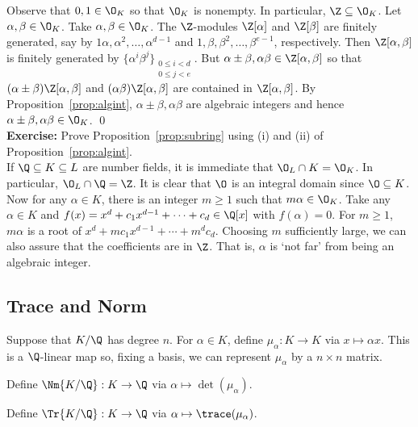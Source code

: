 \pf Observe that $0,1 \in \O_K$ so that $\O_K$ is nonempty. In particular, $\Z \subseteq \O_K$. Let $\alpha, \beta \in \O_K$. Take $\alpha, \beta \in \O_K$. The $\Z$-modules $\Z[\alpha]$ and $\Z[\beta]$ are finitely generated, say by $1\alpha,\alpha^2,\ldots,\alpha^{d-1}$ and $1,\beta,\beta^2,\ldots,\beta^{e-1}$, respectively. Then $\Z[\alpha,\beta]$ is finitely generated by $\{\alpha^i \beta^j\}_{\substack{0 \leq i < d \\ 0 \leq j < e}}$. But $\alpha \pm \beta,\alpha\beta \in \Z[\alpha,\beta]$ so that $(\alpha \pm \beta) \Z[\alpha,\beta]$ and $(\alpha\beta)\Z[\alpha,\beta]$ are contained in $\Z[\alpha,\beta]$. By Proposition~\ref{prop:algint}, $\alpha\pm \beta, \alpha\beta$ are algebraic integers and hence $\alpha\pm\beta,\alpha\beta \in \O_K$. \qed \\


\noindent \textbf{Exercise: } Prove Proposition~\ref{prop:subring} using (i) and (ii) of Proposition~\ref{prop:algint}. \\

If $\Q \subseteq K \subseteq L$ are number fields, it is immediate that $\O_L \cap K = \O_K$. In particular, $\O_L \cap \Q= \Z$. It is clear that $\O$ is an integral domain since $\O \subseteq K$. Now for any $\alpha \in K$, there is an integer $m \geq 1$ such that $m\alpha \in \O_K$. Take any $\alpha \in K$ and $f(x)=x^d+c_1x^{d-1}+\cdots+c_d \in \Q[x]$ with $f(\alpha)=0$. For $m \geq 1$, $m\alpha$ is a root of $x^d+mc_1x^{d-1}+\cdots+m^dc_d$. Choosing $m$ sufficiently large, we can also assure that the coefficients are in $\Z$. That is, $\alpha$ is `not far' from being an algebraic integer. 


\subsection{Trace and Norm}

Suppose that $K/\Q$ has degree $n$. For $\alpha \in K$, define $\mu_\alpha: K \to K$ via $x \mapsto \alpha x$. This is a $\Q$-linear map so, fixing a basis, we can represent $\mu_\alpha$ by a $n \times n$ matrix. 

\begin{dfn}[Norm]
Define $\Nm{K/\Q}: K \to \Q$ via $\alpha \mapsto \det(\mu_\alpha)$. 
\end{dfn}

\begin{dfn}[Trace]
Define $\Tr{K/\Q}: K \to \Q$ via $\alpha \mapsto \trace(\mu_\alpha)$. 
\end{dfn}

